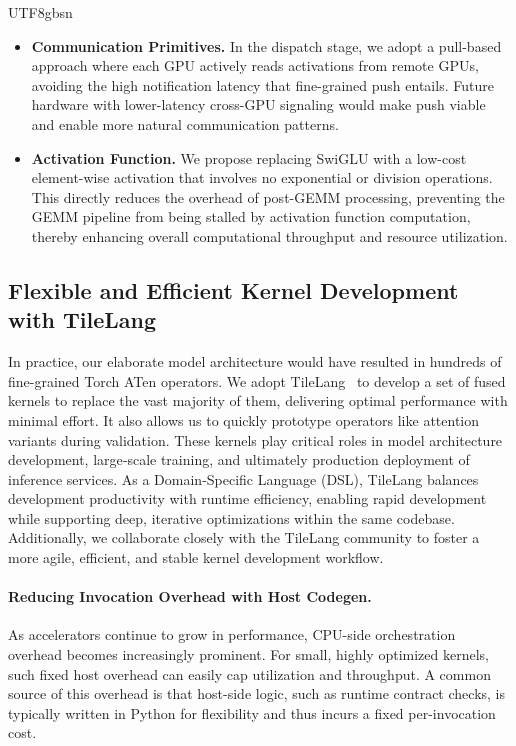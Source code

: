 \documentclass[11pt, a4paper, logo, copyright, nonumbering]{deepseek}
\begin{document}
\begin{CJK*}{UTF8}{gbsn}
\begin{itemize}[topsep=0pt]
    \item \textbf{Communication Primitives.}
    In the dispatch stage, we adopt a pull-based approach where each GPU actively reads activations from remote GPUs, avoiding the high notification latency that fine-grained push entails. 
    Future hardware with lower-latency cross-GPU signaling would make push viable and enable more natural communication patterns.

    \item \textbf{Activation Function.}
    We propose replacing SwiGLU with a low-cost element-wise activation that involves no exponential or division operations. 
    This directly reduces the overhead of post-GEMM processing, preventing the GEMM pipeline from being stalled by activation function computation, thereby enhancing overall computational throughput and resource utilization.
\end{itemize}

\subsection{Flexible and Efficient Kernel Development with TileLang}

In practice, our elaborate model architecture would have resulted in hundreds of fine-grained Torch ATen operators.
We adopt TileLang~\citep{wangtilelang} to develop a set of fused kernels to replace the vast majority of them, delivering optimal performance with minimal effort.
It also allows us to quickly prototype operators like attention variants during validation.
These kernels play critical roles in model architecture development,  large‑scale training, and ultimately production deployment of inference services.
As a Domain-Specific Language (DSL), TileLang balances development productivity with runtime efficiency, enabling rapid development while supporting deep, iterative optimizations within the same codebase.
Additionally, we collaborate closely with the TileLang community to foster a more agile, efficient, and stable kernel development workflow. 

\paragraph{Reducing Invocation Overhead with Host Codegen.}
As accelerators continue to grow in performance, CPU-side orchestration overhead becomes increasingly prominent. For small, highly optimized kernels, such fixed host overhead can easily cap utilization and throughput. A common source of this overhead is that host-side logic, such as runtime contract checks, is typically written in Python for flexibility and thus incurs a fixed per-invocation cost.


\end{CJK*}
\end{document}
